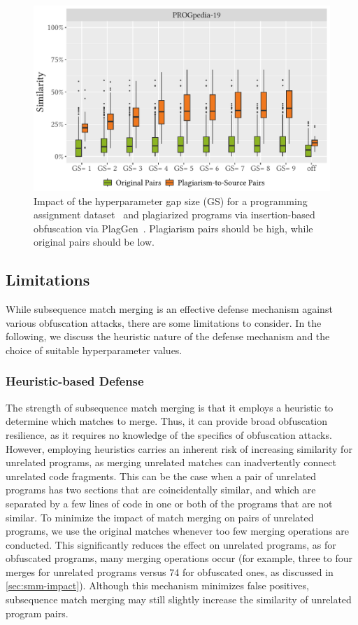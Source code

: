 \begin{figure}[p]
\centering
\includegraphics[width=0.95\linewidth]{figures/algorithm/eval-mm-GS_avg.similarity.pdf}
\caption[Impact of the Gap Size]{Impact of the hyperparameter gap size (GS) for a programming assignment dataset~\cite{paiva2023} and plagiarized programs via insertion-based obfuscation via PlagGen~\cite{Broedel2023}. Plagiarism pairs should be high, while original pairs should be low.}
\label{fig:mm-gs}
\end{figure}


\subsection{Limitations}\label{sec:smm-limits}

While subsequence match merging is an effective defense mechanism against various obfuscation attacks, there are some limitations to consider. In the following, we discuss the heuristic nature of the defense mechanism and the choice of suitable hyperparameter values.

    \subsubsection{Heuristic-based Defense}
    The strength of subsequence match merging is that it employs a heuristic to determine which matches to merge.
    Thus, it can provide broad obfuscation resilience, as it requires no knowledge of the specifics of obfuscation attacks.
    However, employing heuristics carries an inherent risk of increasing similarity for unrelated programs, as merging unrelated matches can inadvertently connect unrelated code fragments. This can be the case when a pair of unrelated programs has two sections that are coincidentally similar, and which are separated by a few lines of code in one or both of the programs that are not similar.
    To minimize the impact of match merging on pairs of unrelated programs, we use the original matches whenever too few merging operations are conducted. This significantly reduces the effect on unrelated programs, as for obfuscated programs, many merging operations occur (for example, three to four merges for unrelated programs versus 74 for obfuscated ones, as discussed in \autoref{sec:smm-impact}). 
    Although this mechanism minimizes false positives, subsequence match merging may still slightly increase the similarity of unrelated program pairs.

